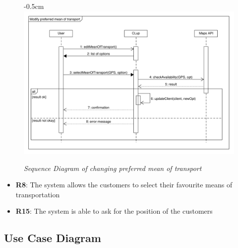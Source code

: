 \documentclass{article}
\begin{document}
\begin{center}
					\begin{figure}[!htb]
						\begin{adjustwidth} {-0.5cm}{}
							\centering
							\includegraphics[scale=0.42]{SD/12_selectPreferredMeanOfTransport.pdf}\\
							\caption{\emph{Sequence Diagram of changing preferred mean of transport}}
						\end{adjustwidth}

					\end{figure}
					
					
					\begin{itemize}
						\medskip
						\newpage
						{\bfseries Required functional requirements: }
						
						
						\item {\bfseries R8}: The system allows the customers to select their favourite means of transportation
						\item {\bfseries R15}: The system is able to ask for the position of the customers
											
						
					\end{itemize}
				\end{center}
		
		\subsection{Use Case Diagram}
		
\end{document}
